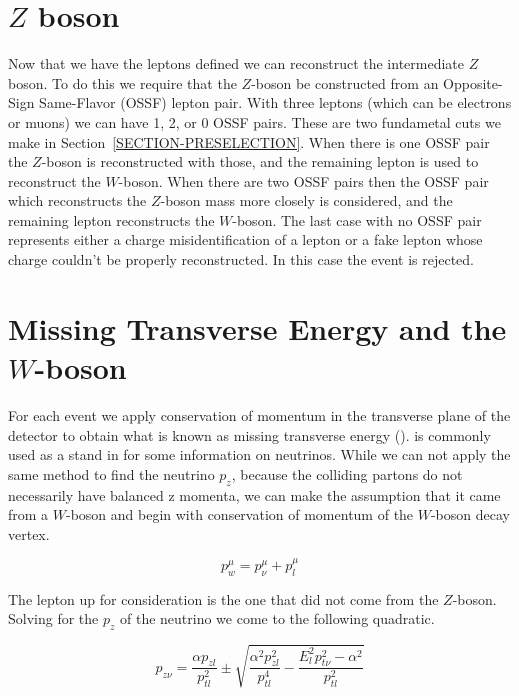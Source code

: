 \section{$Z$ boson}
\label{SECTION-OBJ-Z}

Now that we have the leptons defined we can reconstruct the intermediate $Z$ boson. To do this we require that the $Z$-boson be constructed from an Opposite-Sign Same-Flavor (OSSF) lepton pair. With three leptons (which can be electrons or muons) we can have 1, 2, or 0 OSSF pairs. These are two fundametal cuts we make in Section~\ref{SECTION-PRESELECTION}. When there is one OSSF pair the $Z$-boson is reconstructed with those, and the remaining lepton is used to reconstruct the $W$-boson. When there are two OSSF pairs then the OSSF pair which reconstructs the $Z$-boson mass more closely is considered, and the remaining lepton reconstructs the $W$-boson. The last case with no OSSF pair represents either a charge misidentification of a lepton or a fake lepton whose charge couldn't be properly reconstructed. In this case the event is rejected. 



\section{Missing Transverse Energy and the $W$-boson}
\label{SECTION-OBJ-MET}

For each event we apply conservation of momentum in the transverse plane of the detector to obtain what is known as missing transverse energy (\met). \met is commonly used as a stand in for some information on neutrinos. While we can not apply the same method to find the neutrino $p_z$, because the colliding partons do not necessarily have balanced z momenta, we can make the assumption that it came from a $W$-boson and begin with conservation of momentum of the $W$-boson decay vertex. 

\begin{equation}
\label{EQ-MET-one}
p_{w}^{\mu}=p_{\nu}^{\mu}+p_{l}^{\mu}
\end{equation}

The lepton up for consideration is the one that did not come from the $Z$-boson. Solving for the $p_z$ of the neutrino we come to the following quadratic.

\begin{equation}
\label{EQ-MET-two}
p_{z\nu}=\frac{\alpha  p_{zl}}{p_{tl}^{2}} \pm \sqrt{\frac{\alpha^2 p_{zl}^2}{p_{tl}^4} - \frac{E_l^2 p_{t\nu}^2-\alpha^2}{p_{tl}^2}}
\end{equation}

